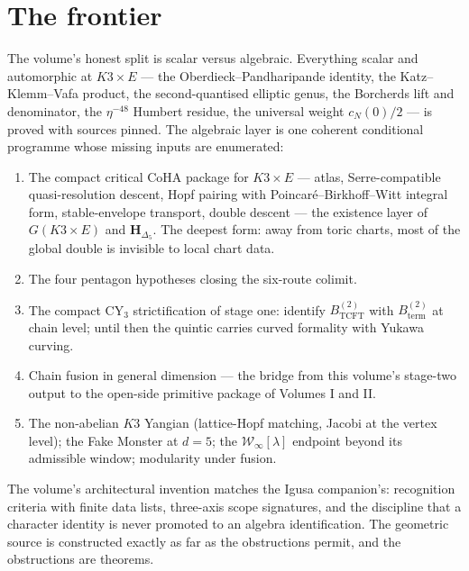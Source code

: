 \documentclass[11pt]{article}
\providecommand{\cW}{\mathcal{W}}
\providecommand{\Dfive}{\Delta_5}
\begin{document}
\section{The frontier}\label{sec:frontier}

The volume's honest split is scalar versus algebraic. Everything
scalar and automorphic at $K3\times E$ --- the
Oberdieck--Pandharipande identity, the Katz--Klemm--Vafa product, the
second-quantised elliptic genus, the Borcherds lift and denominator,
the $\eta^{-48}$ Humbert residue, the universal weight $c_N(0)/2$ ---
is proved with sources pinned. The algebraic layer is one coherent
conditional programme whose missing inputs are enumerated:

\begin{enumerate}
\item The compact critical CoHA package for $K3\times E$ --- atlas,
Serre-compatible quasi-resolution descent, Hopf pairing with
Poincar\'e--Birkhoff--Witt integral form, stable-envelope transport,
double descent --- the existence layer of $G(K3\times E)$ and
$\mathbf H_{\Dfive}$. The deepest form: away from toric charts, most
of the global double is invisible to local chart data.
\item The four pentagon hypotheses closing the six-route colimit.
\item The compact CY$_3$ strictification of stage one: identify
$B^{(2)}_{\mathrm{TCFT}}$ with $B^{(2)}_{\mathrm{term}}$ at chain
level; until then the quintic carries curved formality with Yukawa
curving.
\item Chain fusion in general dimension --- the bridge from this
volume's stage-two output to the open-side primitive package of
Volumes I and II.
\item The non-abelian $K3$ Yangian \textup{(lattice-Hopf matching,
Jacobi at the vertex level)}; the Fake Monster at $d=5$; the
$\cW_\infty[\lambda]$ endpoint beyond its admissible window;
modularity under fusion.
\end{enumerate}

The volume's architectural invention matches the Igusa companion's:
recognition criteria with finite data lists, three-axis scope
signatures, and the discipline that a character identity is never
promoted to an algebra identification. The geometric source is
constructed exactly as far as the obstructions permit, and the
obstructions are theorems.
\end{document}
